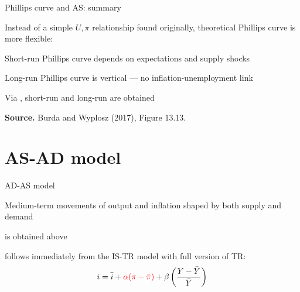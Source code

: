 \documentclass{beamer}
\newcommand{\tb}[1]{{\color{blue}{\textbf{#1}}}}
\newcommand{\tr}[1]{{\color{red}{\textbf{#1}}}}
\newenvironment{mytemize}
{\vfill\itemize[nolistsep,itemsep=\fill,label=\color{blue}{$\triangleright$}]}
  {\enditemize}
\newenvironment{mynumerate}
{\vfill\enumerate[nolistsep,itemsep=\fill,label=\arabic*.]}
  {\endenumerate}
\begin{document}
\begin{frame}{Phillips curve and AS: summary} 
\begin{mytemize}
\item Instead of a simple $U, \pi$ relationship found originally, theoretical Phillips curve is more flexible:
\begin{mynumerate}
\item Short-run Phillips curve depends on expectations and supply shocks
\item Long-run Phillips curve is vertical --- no inflation-unemployment link
\end{mynumerate}
\item Via \tb{Okun's law}, short-run and long-run \tb{AS} are obtained
\end{mytemize}

\begin{center}
\begin{figure}[h!]
\end{figure}
\vspace{-2mm} \begin{minipage}{0.50\columnwidth}
\tiny	
\textbf{Source.} Burda and Wyplosz (2017), Figure 13.13.\\
\end{minipage}
\end{center}
\end{frame}
\section{AS-AD model}
\begin{frame}{AD-AS model}
  \begin{mytemize}
  \item Medium-term movements of output and inflation shaped by both supply and demand
  \item \tb{AS} is obtained above
  \item \tr{AD} follows immediately from the IS-TR model with full version of TR:
  $$i = \bar i + \textcolor{red}{\alpha (\pi - \bar \pi)} + \beta \left(\frac{Y- \bar Y}{\bar Y}\right)$$
  \end{mytemize}
\end{frame}
\end{document}
